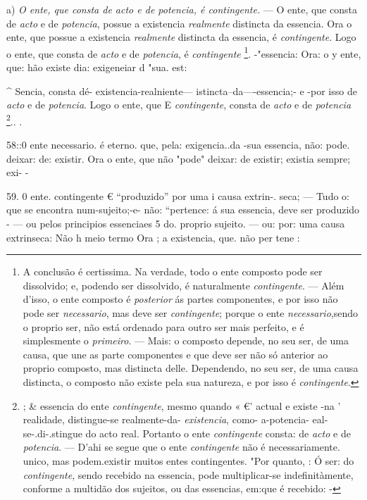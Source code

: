 a) \emph{O ente, que consta de acto e de potencia, é contingente.} --- O ente, que consta de \emph{acto} e de \emph{potencia}, possue a existencia \emph{realmente} distincta da essencia. Ora o ente, que possue a existencia \emph{realmente} distincta da essencia, é \emph{contingente}. Logo o ente, que consta de \emph{acto} e de \emph{potencia}, é \emph{contingente} \footnote{A conclusão é certissima. Na verdade, todo o ente composto pode ser dissolvido; e, podendo ser dissolvido, é naturalmente \emph{contingente}. --- Além d'isso, o ente composto é \emph{posterior} ás partes componentes, e por isso não pode ser \emph{necessario}, mas deve ser \emph{contingente}; porque o ente \emph{necessario},sendo o proprio ser, não está ordenado para outro ser mais perfeito, e é simplesmente o \emph{primeiro}. --- Mais: o composto depende, no seu ser, de uma causa, que une as parte componentes e que deve ser não só anterior ao proprio composto, mas distincta delle. Dependendo, no seu ser, de uma causa distincta, o composto não existe pela sua natureza, e por isso é \emph{contingente}.}.  -"essencia: Ora: o y ente, que: hão existe dia: exigeneiar d "sua. est:

\textasciicircum{} Sencia, consta dé- existencia-realniente--- istincta--da----essencia;- e -por isso de \emph{acto} e de \emph{potencia}. Logo o ente, que E \emph{contingente}, \textbar{} consta de \emph{acto} e de \emph{potencia} \footnote{; \& essencia do ente \emph{contingente}, mesmo quando « €' actual e existe -na ' realidade, distingue-se realmente-da- \emph{existencia}, como- a-potencia- eal-se-.di-.stingue do acto real. Portanto o ente \emph{contingente} consta: de \emph{acto} e de \emph{potencia}. --- D'ahi se segue que o ente \emph{contingente} não é necessariamente. unico, mas podem.existir muitos entes contingentes. "Por quanto, : Ó ser: do \emph{contingente}, sendo recebido na essencia, pode multiplicar-se indefinitàmente, conforme a multidão dos sujeitos, ou das essencias, em:que é recebido: \textbar{} -}.. .

58::0 ente necessario. é eterno. \textbar{}que, pela: exigencia..da -sua essencia, não: pode. deixar: de: existir. Ora o ente, que não "pode" deixar: de existir; existia sempre; exi- -

59. 0 ente. contingente € “produzido” por uma i causa extrin-. seca; --- Tudo o: que se encontra num-sujeito;-e- não: “pertence: á sua essencia, deve ser produzido - --- ou pelos principios essenciaes 5 do. proprio sujeito. --- ou: por: uma causa extrinseca: Não h meio termo Ora ; a existencia, que. não per tene :

